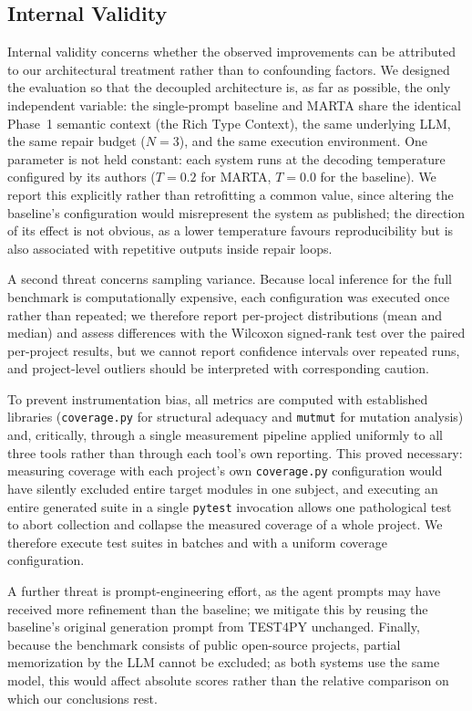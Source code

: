\subsection{Internal Validity}
Internal validity concerns whether the observed improvements can be attributed to our
architectural treatment rather than to confounding factors. We designed the
evaluation so that the decoupled architecture is, as far as possible, the only
independent variable: the single-prompt baseline and MARTA share the identical
Phase~1 semantic context (the Rich Type Context), the same underlying LLM, the same
repair budget ($N=3$), and the same execution environment. One parameter is not held
constant: each system runs at the decoding temperature configured by its authors
($T=0.2$ for MARTA, $T=0.0$ for the baseline). We report this explicitly rather than
retrofitting a common value, since altering the baseline's configuration would
misrepresent the system as published; the direction of its effect is not obvious, as
a lower temperature favours reproducibility but is also associated with repetitive
outputs inside repair loops.

A second threat concerns sampling variance. Because local inference for the full
benchmark is computationally expensive, each configuration was executed once rather
than repeated; we therefore report per-project distributions (mean and median) and
assess differences with the Wilcoxon signed-rank test over the paired per-project
results, but we cannot report confidence intervals over repeated runs, and
project-level outliers should be interpreted with corresponding caution.

To prevent instrumentation bias, all metrics are computed with established libraries
(\texttt{coverage.py} for structural adequacy and \texttt{mutmut} for mutation
analysis) and, critically, through a single measurement pipeline applied uniformly to
all three tools rather than through each tool's own reporting. This proved necessary:
measuring coverage with each project's own \texttt{coverage.py} configuration would
have silently excluded entire target modules in one subject, and executing an entire
generated suite in a single \texttt{pytest} invocation allows one pathological test to
abort collection and collapse the measured coverage of a whole project. We therefore
execute test suites in batches and with a uniform coverage configuration.

A further threat is prompt-engineering effort, as the agent prompts may have received
more refinement than the baseline; we mitigate this by reusing the baseline's original
generation prompt from TEST4PY \cite{test4py2025} unchanged. Finally, because the
benchmark consists of public open-source projects, partial memorization by the LLM
cannot be excluded; as both systems use the same model, this would affect absolute
scores rather than the relative comparison on which our conclusions rest.


